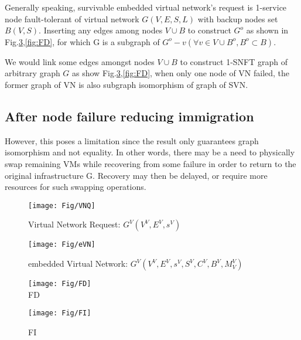 Generally speaking, survivable embedded virtual network's request is 1-service node fault-tolerant of virtual network $G(V,E,S,L)$ with backup nodes set $B(V,S)$. Inserting any edges among nodes $V\cup B$ to construct $G^o$ as shown in Fig.\ref{fig:FI},\ref{fig:FD}, for which G is a subgraph of $G^o-v(\forall v\in V\cup B^o,B^o\subset B)$.

We would link some edges amongst nodes $V\cup B$ to construct 1-SNFT graph of arbitrary graph $G$ as show Fig.\ref{fig:FI},\ref{fig:FD}, when only one node of VN failed, the former graph of VN is also subgraph isomorphism of graph of SVN. %




\subsection{After node failure reducing immigration}
However, this poses a limitation since the result only guarantees graph isomorphism and not equality. In other words, there may be a need to physically swap remaining VMs while recovering from some failure in order to return to the original infrastructure G. Recovery may then be delayed, or require more resources for such swapping operations.





\begin{figure}
\centering
\texttt{[image: Fig/VNQ]}\\
\caption{Virtual Network Request: $G^V (V^V,E^V,s^V)$}\label{fig:VNQ}
\end{figure}

\begin{figure}
\centering
\texttt{[image: Fig/eVN]}\\
\caption{embedded Virtual Network: $G^V (V^V,E^V,s^V,S^V,C^V,B^V,M^V_V)$}\label{fig:eVN}
\end{figure}

\begin{figure}
\centering
\begin{minipage}[t]{0.5\linewidth}
\centering
\texttt{[image: Fig/FD]}\\
\caption{ FD}\label{fig:FD}
\end{minipage}
\hfill
\begin{minipage}[t]{0.5\linewidth}
\centering
\texttt{[image: Fig/FI]}\\
\caption{FI}\label{fig:FI}
\end{minipage}
\end{figure}




